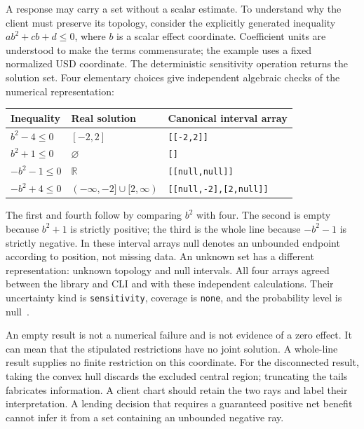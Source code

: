 A response may carry a set without a scalar estimate. To understand why the
client must preserve its topology, consider the explicitly generated
inequality $a b^2+c b+d\leq0$, where $b$ is a scalar effect coordinate.
Coefficient units are understood to make the terms commensurate; the example
uses a fixed normalized USD coordinate. The deterministic sensitivity
operation returns the solution set. Four elementary choices give independent
algebraic checks of the numerical representation:
\begin{center}
\begin{tabularx}{\textwidth}{P{.20\textwidth}P{.29\textwidth}X}
\toprule
Inequality & Real solution & Canonical interval array \\
\midrule
$b^2-4\leq0$ & $[-2,2]$ & \texttt{[[-2,2]]} \\
$b^2+1\leq0$ & $\varnothing$ & \texttt{[]} \\
$-b^2-1\leq0$ & $\mathbb R$ & \texttt{[[null,null]]} \\
$-b^2+4\leq0$ & $(-\infty,-2]\cup[2,\infty)$ & \texttt{[[null,-2],[2,null]]} \\
\bottomrule
\end{tabularx}
\end{center}
The first and fourth follow by comparing $b^2$ with four. The second is empty
because $b^2+1$ is strictly positive; the third is the whole line because
$-b^2-1$ is strictly negative. In these interval arrays null denotes an
unbounded endpoint according to position, not missing data. An unknown set
has a different representation: unknown topology and null intervals.
All four arrays agreed between the library and CLI and with these independent
calculations. Their uncertainty kind is \texttt{sensitivity}, coverage is
\texttt{none}, and the probability level is null~\citep{exec13_i2_examples}.

An empty result is not a numerical failure and is not evidence of a zero
effect. It can mean that the stipulated restrictions have no joint solution.
A whole-line result supplies no finite restriction on this coordinate. For
the disconnected result, taking the convex hull discards the excluded central
region; truncating the tails fabricates information. A client chart should
retain the two rays and label their interpretation. A lending decision that
requires a guaranteed positive net benefit cannot infer it from a set containing
an unbounded negative ray.

